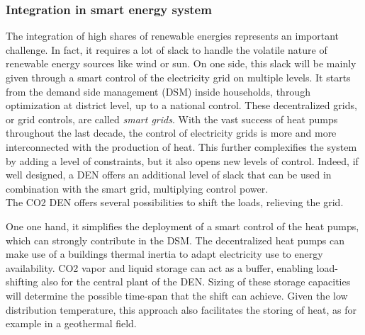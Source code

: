 \documentclass{article}
\begin{document}
\subsubsection{Integration in smart energy system}
The integration of high shares of renewable energies represents an important challenge. In fact, it requires a lot of slack to handle the volatile nature of renewable energy sources like wind or sun. On one side, this slack will be mainly given through a smart control of the electricity grid on multiple levels. It starts from the demand side management (DSM) inside households, through optimization at district level, up to a national control. These decentralized grids, or grid controls, are called \textit{smart grids}. With the vast success of heat pumps throughout the last decade, the control of electricity grids is more and more interconnected with the production of heat. This further complexifies the system by adding a level of constraints, but it also opens new levels of control. Indeed, if well designed, a DEN offers an additional level of slack that can be used in combination with the smart grid, multiplying control power.\\
The CO2 DEN offers several possibilities to shift the loads, relieving the grid. 

One one hand, it simplifies the deployment of a smart control of the heat pumps, which can strongly contribute in the DSM. The decentralized heat pumps can make use of a buildings thermal inertia to adapt electricity use to energy availability. CO2 vapor and liquid storage can act as a buffer, enabling load-shifting also for the central plant of the DEN. Sizing of these storage capacities will determine the possible time-span that the shift can achieve. Given the low distribution temperature, this approach also facilitates the storing of heat, as for example in a geothermal field.\\
\end{document}
